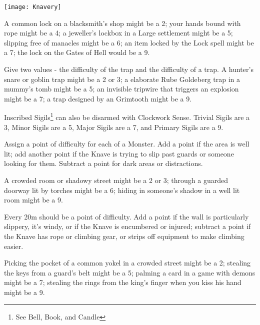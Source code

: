 {  \begin{center}
  \texttt{[image: Knavery]}
  \end{center}

  \begin{multicols}{2}

  A common lock on a blacksmith's shop might be a 2; your hands bound with rope might be a 4; a jeweller's lockbox in a Large settlement might be a 5; slipping free of manacles might be a 6;  an item locked by the Lock spell might be a 7; the lock on the Gates of Hell would be a 9.

  Give two values - the difficulty of  the trap and the difficulty of  a trap.  A hunter's snare or goblin trap might be a 2 or 3; a elaborate Rube Goldeberg trap in a mummy's tomb might be a 5; an invisible tripwire that triggers an explosion might be a 7; a trap designed by an Grimtooth might be a 9.

  Inscribed Sigils\footnote{See Bell, Book, and Candle} can also be disarmed with Clockwork Sense. Trivial Sigils are a 3, Minor Sigils are a 5, Major Sigils are a 7, and Primary Sigils are a 9.

  Assign a point of difficulty for each \HD of a Monster.  Add a point if the area is well lit; add another point if the Knave is trying to slip past guards or someone looking for them.  Subtract a point for dark areas or distractions.

  A crowded room or shadowy street might be a 2 or 3; through a guarded doorway lit by torches might be a 6; hiding in someone's shadow in a well lit room might be a 9.


  Every 20m should be a point of difficulty.  Add a point if the wall is particularly slippery, it's windy, or if the Knave is encumbered or injured; subtract a point if the Knave has rope or climbing gear, or strips off equipment to make climbing easier.

  Picking the pocket of a common yokel in a crowded street might be a 2; stealing the keys from a guard's belt might be a 5; palming a card in a game with demons might be a 7; stealing the rings from the king's finger when you kiss his hand might be a 9.


\end{multicols}}
